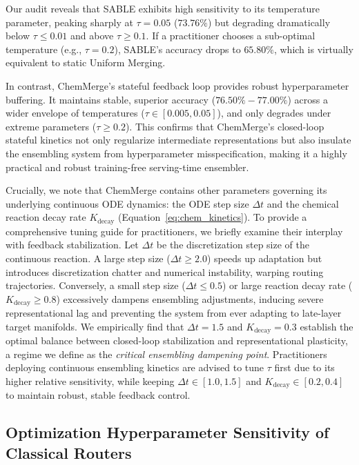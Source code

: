 Our audit reveals that SABLE exhibits high sensitivity to its temperature parameter, peaking sharply at $\tau = 0.05$ ($73.76\%$) but degrading dramatically below $\tau \le 0.01$ and above $\tau \ge 0.1$. If a practitioner chooses a sub-optimal temperature (e.g., $\tau = 0.2$), SABLE's accuracy drops to $65.80\%$, which is virtually equivalent to static Uniform Merging.

In contrast, ChemMerge's stateful feedback loop provides robust hyperparameter buffering. It maintains stable, superior accuracy ($76.50\% - 77.00\%$) across a wider envelope of temperatures ($\tau \in [0.005, 0.05]$), and only degrades under extreme parameters ($\tau \ge 0.2$). This confirms that ChemMerge's closed-loop stateful kinetics not only regularize intermediate representations but also insulate the ensembling system from hyperparameter misspecification, making it a highly practical and robust training-free serving-time ensembler.

Crucially, we note that ChemMerge contains other parameters governing its underlying continuous ODE dynamics: the ODE step size $\Delta t$ and the chemical reaction decay rate $K_{\text{decay}}$ (Equation~\ref{eq:chem_kinetics}). To provide a comprehensive tuning guide for practitioners, we briefly examine their interplay with feedback stabilization. Let $\Delta t$ be the discretization step size of the continuous reaction. A large step size ($\Delta t \ge 2.0$) speeds up adaptation but introduces discretization chatter and numerical instability, warping routing trajectories. Conversely, a small step size ($\Delta t \le 0.5$) or large reaction decay rate ($K_{\text{decay}} \ge 0.8$) excessively dampens ensembling adjustments, inducing severe representational lag and preventing the system from ever adapting to late-layer target manifolds. We empirically find that $\Delta t = 1.5$ and $K_{\text{decay}} = 0.3$ establish the optimal balance between closed-loop stabilization and representational plasticity, a regime we define as the \emph{critical ensembling dampening point}. Practitioners deploying continuous ensembling kinetics are advised to tune $\tau$ first due to its higher relative sensitivity, while keeping $\Delta t \in [1.0, 1.5]$ and $K_{\text{decay}} \in [0.2, 0.4]$ to maintain robust, stable feedback control.

\subsection{Optimization Hyperparameter Sensitivity of Classical Routers}
\label{subsec:optimization_sensitivity}

